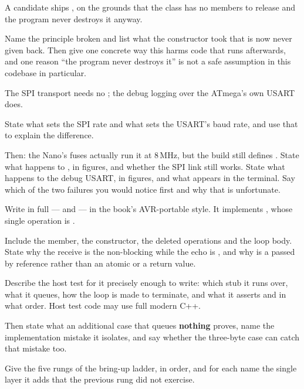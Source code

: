  A candidate ships , on the grounds that the
class has no members to release and the program never destroys it anyway.

Name the principle broken and list what the constructor took that is now never given back. Then
give one concrete way this harms code that runs afterwards, and one reason ``the program never
destroys it'' is not a safe assumption in this codebase in particular. 

 The SPI transport needs no ; the debug logging over the ATmega's own USART
does.

State what sets the SPI  rate and what sets the USART's baud rate, and use that to explain
the difference.

Then: the Nano's fuses actually run it at 8\,MHz, but the build still defines
. State what happens to , in figures, and whether the SPI link still
works. State what happens to the debug USART, in figures, and what appears in the terminal. Say
which of the two failures you would notice first and why that is unfortunate. 

\label{exb:q:8}

 Write  in full ---  and
 --- in the book's AVR-portable style. It implements
, whose single operation is .

Include the member, the constructor, the deleted operations and the loop body. State why the
receive is the non-blocking  while the echo is , and why
 is a  passed by  reference rather than an atomic or a
return value. 

 Describe the host test for it precisely enough to write: which stub it runs over, what it
queues, how the loop is made to terminate, and what it asserts and in what order. Host test code may
use full modern C++.

Then state what an additional case that queues \textbf{nothing} proves, name the implementation
mistake it isolates, and say whether the three-byte case can catch that mistake too. 

 Give the five rungs of the bring-up ladder, in order, and for each name the single layer
it adds that the previous rung did not exercise.

